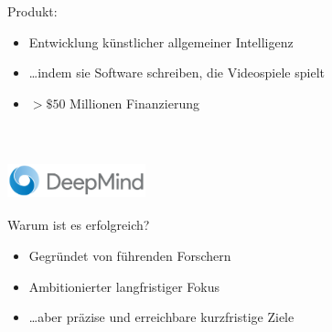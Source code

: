 \documentclass{beamer}
\begin{document}
\begin{frame}
    Produkt: \\
    \begin{itemize}
        \item<1-> Entwicklung künstlicher allgemeiner Intelligenz
        \item<2-> \dots indem sie Software schreiben, die Videospiele spielt
        \item<3-> $>\$50$ Millionen Finanzierung
    \end{itemize} ~\\
\end{frame}

\begin{frame}
    \frametitle{\includegraphics[width=0.3\textwidth]{deepmind.png}}
    Warum ist es erfolgreich? \\
    \begin{itemize}
        \item<1-> Gegründet von führenden Forschern
        \item<2-> Ambitionierter langfristiger Fokus
        \item<3-> \dots aber präzise und erreichbare kurzfristige Ziele
    \end{itemize} ~\\
\end{frame}
\end{document}
